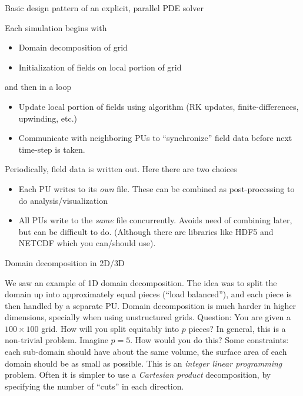 \documentclass[aspectratio=169]{beamer}
\newcommand{\mypause}{\pause}
\begin{document}
\begin{frame}{Basic design pattern of an explicit, parallel PDE
    solver}

  Each simulation begins with
  \begin{itemize}
  \item Domain decomposition of grid
  \item Initialization of fields on local portion of grid
  \end{itemize}
  \mypause%
  and then in a loop
  \begin{itemize}
  \item Update local portion of fields using algorithm (RK updates,
    finite-differences, upwinding, etc.)
  \item Communicate with neighboring PUs to ``synchronize'' field data
    before next time-step is taken.
  \end{itemize}
  \mypause%
  Periodically, field data is written out. Here there are two choices
  \begin{itemize}
  \item Each PU writes to its \emph{own} file. These can be combined
    as post-processing to do analysis/visualization
  \item All PUs write to the \emph{same} file concurrently. Avoids
    need of combining later, but can be difficult to do. (Although
    there are libraries like HDF5 and NETCDF which you can/should
    use).
  \end{itemize}

\end{frame}

\begin{frame}{Domain decomposition in 2D/3D}

  We saw an example of 1D domain decomposition. The idea was to split
  the domain up into approximately equal pieces (``load balanced''),
  and each piece is then handled by a separate PU.%
  \vskip0.1in%
  Domain decomposition is much harder in higher dimensions, specially
  when using unstructured grids.%
  \vskip0.1in%
  {\color{blue} Question: You are given a $100\times 100$ grid. How
    will you split equitably into $p$ pieces?}%
  \mypause%
  \vskip0.1in%
  In general, this is a non-trivial problem. Imagine $p=5$. How would
  you do this? Some constraints: each sub-domain should have about the
  same volume, the surface area of each domain should be as small as
  possible. This is an \emph{integer linear programming} problem.%
  \vskip0.1in%
  Often it is simpler to use a \emph{Cartesian product} decomposition,
  by specifying the number of ``cuts'' in each direction.
\end{frame}
\end{document}
